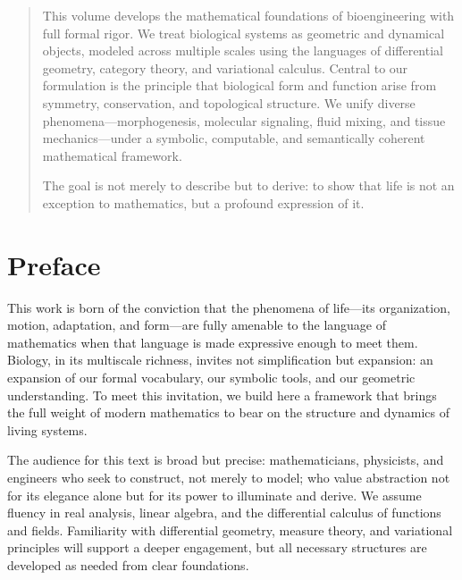 \documentclass[11pt,reqno]{amsart}
\begin{document}
\newpage


\begin{abstract}
This volume develops the mathematical foundations of bioengineering with full formal rigor. We treat biological systems as geometric and dynamical objects, modeled across multiple scales using the languages of differential geometry, category theory, and variational calculus. Central to our formulation is the principle that biological form and function arise from symmetry, conservation, and topological structure. We unify diverse phenomena—morphogenesis, molecular signaling, fluid mixing, and tissue mechanics—under a symbolic, computable, and semantically coherent mathematical framework.

The goal is not merely to describe but to derive: to show that life is not an exception to mathematics, but a profound expression of it.
\end{abstract}

\tableofcontents
\pagebreak

\section*{Preface}

This work is born of the conviction that the phenomena of life—its organization, motion, adaptation, and form—are fully amenable to the language of mathematics when that language is made expressive enough to meet them. Biology, in its multiscale richness, invites not simplification but expansion: an expansion of our formal vocabulary, our symbolic tools, and our geometric understanding. To meet this invitation, we build here a framework that brings the full weight of modern mathematics to bear on the structure and dynamics of living systems.

The audience for this text is broad but precise: mathematicians, physicists, and engineers who seek to construct, not merely to model; who value abstraction not for its elegance alone but for its power to illuminate and derive. We assume fluency in real analysis, linear algebra, and the differential calculus of functions and fields. Familiarity with differential geometry, measure theory, and variational principles will support a deeper engagement, but all necessary structures are developed as needed from clear foundations.
\end{document}
